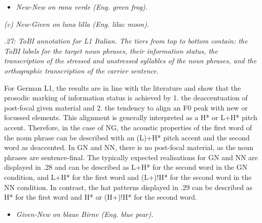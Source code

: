   
 

\begin{itemize}
\item \begin{styleListParagraph}
\textit{New-New on rana verde (Eng. green frog).}
\end{styleListParagraph}
\end{itemize}

  
 

\textit{(c) New-Given on luna lilla (Eng. lilac moon).}

\begin{stylelsTable}
\textit{.27: ToBI annotation for L1 Italian. The tiers from top to bottom contain: the ToBI labels for the target noun phrases, their information status, the transcription of the stressed and unstressed syllables of the noun phrases, and the orthographic transcription of the carrier sentence.}
\end{stylelsTable}

For German L1, the results are in line with the literature and show that the prosodic marking of information status is achieved by 1. the deaccentuation of post-focal given material and 2. the tendency to align an F0 peak with new or focussed elements. This alignment is generally interpreted as a H* or L+H* pitch accent. Therefore, in the case of NG, the acoustic properties of the first word of the noun phrase can be described with an (L)+H* pitch accent and the second word as deaccented. In GN and NN, there is no post-focal material, as the noun phrases are sentence-final. The typically expected realisations for GN and NN are displayed in .28 and can be described as L+H* for the second word in the GN condition, and L+H* for the first word and (L+)!H* for the second word in the NN condition. In contrast, the hat patterns displayed in .29 can be described as H* for the first word and H* or (H+)!H* for the second word.

  
 

\begin{itemize}
\item \begin{styleListParagraph}
\textit{Given-New on blaue Birne (Eng. blue pear).} 
\end{styleListParagraph}
\end{itemize}

